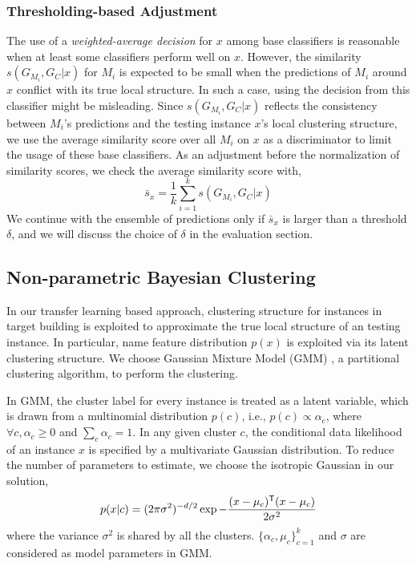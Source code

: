 \subsubsection{Thresholding-based Adjustment}
The use of a \emph{weighted-average decision} for $x$ among base classifiers is reasonable when at least some classifiers perform well on $x$.
However, the similarity $s(G_{M_i}, G_C|x)$ for $M_i$ is expected to be small when the predictions of $M_i$ around $x$ conflict with its true local structure.
In such a case, using the decision from this classifier might be misleading.
Since $s(G_{M_i}, G_C|x)$ reflects the consistency between $M_i$'s predictions and the testing instance $x$'s local clustering structure, we use the average similarity score over all $M_i$ on $x$ as a discriminator to limit the usage of these base classifiers.
As an adjustment before the normalization of similarity scores, we check the average similarity score with,
\begin{equation}\label{ave_sim}
 \bar s_x = \frac {1}{k}\sum_{i=1}^k s(G_{M_i}, G_C|x)
\end{equation}
We continue with the ensemble of predictions only if $\bar s_x$ is larger than a threshold $\delta$, and we will discuss the choice of $\delta$ in the evaluation section.


\subsection{Non-parametric Bayesian Clustering}
\label{sec_clustering}
In our transfer learning based approach, clustering structure for instances in target building is exploited to approximate the true local structure of an testing instance.
In particular, name feature distribution $p(x)$ is exploited via its latent clustering structure.
We choose Gaussian Mixture Model (GMM) \cite{zivkovic2004improved}, a partitional clustering algorithm, to perform the clustering.

In GMM, the cluster label for every instance is treated as a latent variable, which is drawn from a multinomial distribution $p(c)$, i.e., $p(c)\propto\alpha_c$, where $\forall c, \alpha_c\ge0$ and $\sum_c\alpha_c=1$. In any given cluster $c$, the conditional data likelihood of an instance $x$ is specified by a multivariate Gaussian distribution. To reduce the number of parameters to estimate, we choose the isotropic Gaussian in our solution,
\begin{equation}
p(x|c)=(2\pi\sigma^2)^{-d/2}\exp{-\frac{(x-\mu_c)^{\mathsf{T}}(x-\mu_c)}{2\sigma^2}}
\end{equation}
where the variance $\sigma^2$ is shared by all the clusters. $\{\alpha_c, \mu_c\}^k_{c=1}$ and $\sigma$ are considered as model parameters in GMM.

